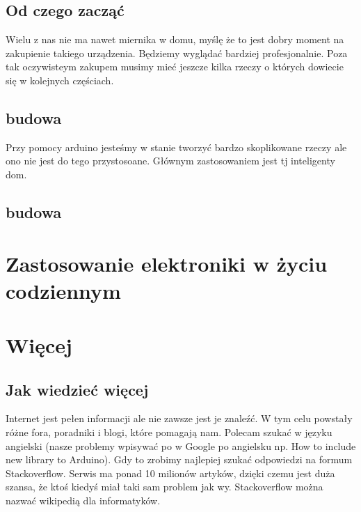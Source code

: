 		\subsection {Od czego zacząć}
			Wielu z nas nie ma nawet miernika w domu, myślę że to jest dobry moment na zakupienie takiego urządzenia. Będziemy wyglądać bardziej profesjonalnie. Poza tak oczywisteym zakupem musimy mieć jeszcze kilka rzeczy o których dowiecie się w kolejnych częściach.
	\subsection{budowa}
	Przy pomocy arduino jesteśmy w stanie tworzyć bardzo skoplikowane rzeczy ale ono nie jest do tego przystosoane. Głównym zastosowaniem jest tj inteligenty dom.
	\subsection{budowa}

\section {Zastosowanie elektroniki w życiu codziennym }

\section {Więcej}

\subsection {Jak wiedzieć więcej}
Internet jest pełen informacji ale nie zawsze jest je znaleźć. W tym celu powstały różne fora, poradniki i blogi, które pomagają nam. Polecam szukać w języku angielski (nasze problemy wpisywać po w Google po angielsku np. How to include new library to Arduino). Gdy to zrobimy najlepiej szukać odpowiedzi na formum Stackoverflow. Serwis ma ponad 10 milionów artyków, dzięki czemu jest duża szansa, że ktoś kiedyś miał taki sam problem jak wy. Stackoverflow można nazwać wikipedią dla informatyków. \cite{klucz02,klucz03}
